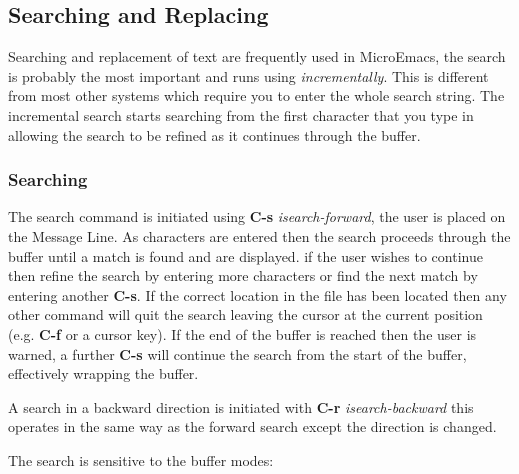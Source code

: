 \documentclass[11pt,a4paper,pdftex]{article}
\begin{document}
\subsection{Searching and Replacing}

  Searching and replacement of text are frequently used in MicroEmacs, the
  search is probably the most important and runs using \textit{incrementally}.
  This is different from most other systems which require you to enter the
  whole search string. The incremental search starts searching from the first
  character that you type in allowing the search to be refined as it continues
  through the buffer.

\subsubsection{Searching}

  The search command is initiated using \textbf{C-s} \textit{isearch-forward},
  the user is placed on the Message Line. As characters are entered then the
  search proceeds through the buffer until a match is found and are displayed.
  if the user wishes to continue then refine the search by entering more
  characters or find the next match by entering another \textbf{C-s}. If the
  correct location in the file has been located then any other command will
  quit the search leaving the cursor at the current position (e.g.
  \textbf{C-f} or a cursor key). If the end of the buffer is reached then the
  user is warned, a further \textbf{C-s} will continue the search from the
  start of the buffer, effectively wrapping the buffer.

  A search in a backward direction is initiated with \textbf{C-r}
  \textit{isearch-backward} this operates in the same way as the forward
  search except the direction is changed.

  The search is sensitive to the buffer modes:
\end{document}
